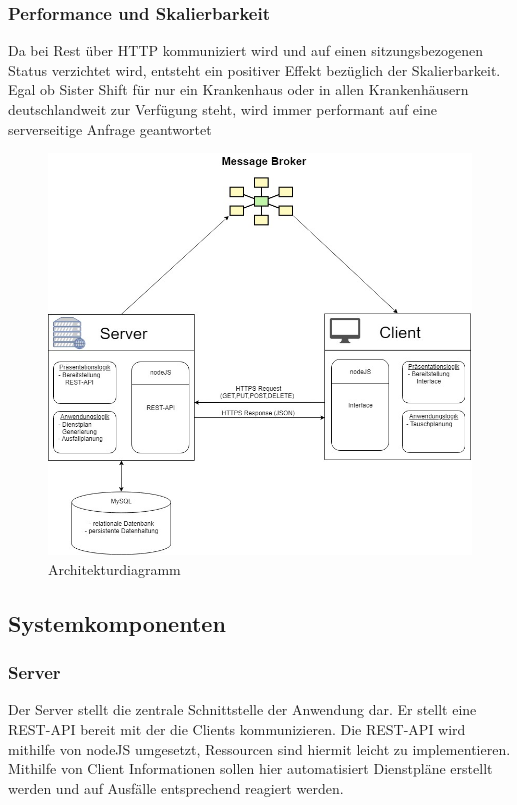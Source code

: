 \documentclass[10pt,a4paper]{article}
\begin{document}
\subsubsection{Performance und Skalierbarkeit}
Da bei Rest über HTTP kommuniziert wird und auf einen sitzungsbezogenen Status verzichtet wird, entsteht ein positiver Effekt bezüglich der Skalierbarkeit. Egal ob Sister Shift für nur ein Krankenhaus oder in allen Krankenhäusern deutschlandweit zur Verfügung steht, wird immer performant auf eine serverseitige Anfrage geantwortet
\begin{figure}[H]
\includegraphics[scale=0.45]{Bilder/Architekturdiagramm.jpg}{\centering}
\caption{Architekturdiagramm}
\end{figure}
\subsection{Systemkomponenten}
\subsubsection{Server}
Der Server stellt die zentrale Schnittstelle der Anwendung dar. Er stellt eine REST-API bereit mit der die Clients kommunizieren. Die REST-API wird mithilfe von nodeJS umgesetzt, Ressourcen sind hiermit leicht zu implementieren. Mithilfe von Client Informationen sollen hier automatisiert Dienstpläne erstellt werden und auf Ausfälle entsprechend reagiert werden.
\end{document}
